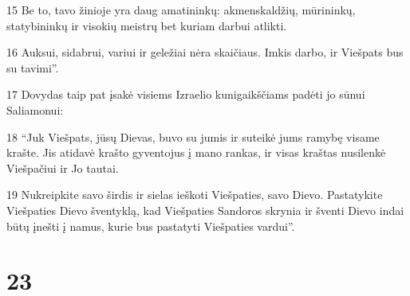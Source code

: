 \par 15 Be to, tavo žinioje yra daug amatininkų: akmenskaldžių, mūrininkų, statybininkų ir visokių meistrų bet kuriam darbui atlikti. 
\par 16 Auksui, sidabrui, variui ir geležiai nėra skaičiaus. Imkis darbo, ir Viešpats bus su tavimi”. 
\par 17 Dovydas taip pat įsakė visiems Izraelio kunigaikščiams padėti jo sūnui Saliamonui: 
\par 18 “Juk Viešpats, jūsų Dievas, buvo su jumis ir suteikė jums ramybę visame krašte. Jis atidavė krašto gyventojus į mano rankas, ir visas kraštas nusilenkė Viešpačiui ir Jo tautai. 
\par 19 Nukreipkite savo širdis ir sielas ieškoti Viešpaties, savo Dievo. Pastatykite Viešpaties Dievo šventyklą, kad Viešpaties Sandoros skrynia ir šventi Dievo indai būtų įnešti į namus, kurie bus pastatyti Viešpaties vardui”.



\chapter{23}



